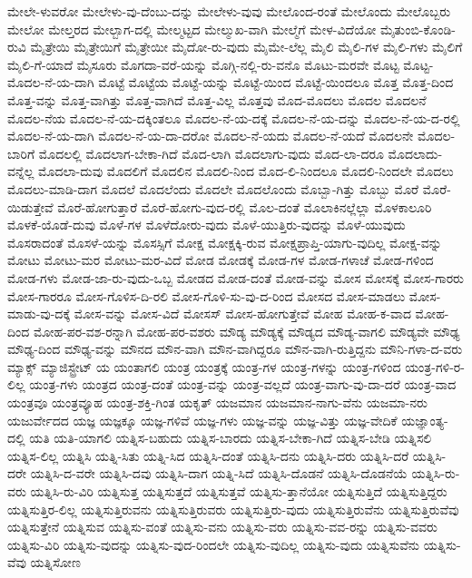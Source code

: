 {ಮೇಲೇ-ಳುವರೋ
ಮೇಲೇಳು-ವು-ದೆಂಬು-ದನ್ನು
ಮೇಲೇಳು-ವುವು
ಮೇಲೊಂದ-ರಂತೆ
ಮೇಲೊಂದು
ಮೇಲೊಬ್ಬರು
ಮೇಲೋ
ಮೇಲ್ತರದ
ಮೇಲ್ಬಾಗ-ದಲ್ಲಿ
ಮೇಲ್ಮಟ್ಟದ
ಮೇಲ್ಮುಖ-ವಾಗಿ
ಮೇಲ್ಮೆಗೆ
ಮೇಳ-ವಿದೆಯೋ
ಮೈತುಂಬಿ-ಕೊಂಡಿ-ರುವಿ
ಮೈತ್ರೇಯಿ
ಮೈತ್ರೇಯಿಗೆ
ಮೈತ್ರೇಯೀ
ಮೈದೋ-ರು-ವುದು
ಮೈಮೇ-ಲೆಲ್ಲ
ಮೈಲಿ
ಮೈಲಿ-ಗಳ
ಮೈಲಿ-ಗಳು
ಮೈಲಿಗೆ
ಮೈಲಿ-ಗೆ-ಯಾದೆ
ಮೈಸೂರು
ಮೊಗದಾ-ವರೆ-ಯನ್ನು
ಮೊಗ್ಗಿ-ನಲ್ಲಿ-ರು-ವನೊ
ಮೊಟು-ಮರವೇ
ಮೊಟ್ಟ
ಮೊಟ್ಟ-ಮೊದಲ-ನೆ-ಯ-ದಾಗಿ
ಮೊಟ್ಟೆ
ಮೊಟ್ಟೆಯ
ಮೊಟ್ಟೆ-ಯನ್ನು
ಮೊಟ್ಟೆ-ಯಿಂದ
ಮೊಟ್ಟೆ-ಯಿಂದಲೂ
ಮೊತ್ತ
ಮೊತ್ತ-ದಿಂದ
ಮೊತ್ತ-ವನ್ನು
ಮೊತ್ತ-ವಾಗಿತ್ತು
ಮೊತ್ತ-ವಾಗಿದೆ
ಮೊತ್ತ-ವಿಲ್ಲ
ಮೊತ್ತವು
ಮೊದ-ಮೊದಲು
ಮೊದಲ
ಮೊದಲನೆ
ಮೊದಲ-ನೆಯ
ಮೊದಲ-ನೆ-ಯ-ದಕ್ಕಿಂತಲೂ
ಮೊದಲ-ನೆ-ಯ-ದಕ್ಕೆ
ಮೊದಲ-ನೆ-ಯ-ದನ್ನು
ಮೊದಲ-ನೆ-ಯ-ದ-ರಲ್ಲಿ
ಮೊದಲ-ನೆ-ಯ-ದಾಗಿ
ಮೊದಲ-ನೆ-ಯ-ದಾ-ದರೋ
ಮೊದಲ-ನೆ-ಯದು
ಮೊದಲ-ನೆ-ಯದೆ
ಮೊದಲನೇ
ಮೊದಲ-ಬಾರಿಗೆ
ಮೊದಲಲ್ಲಿ
ಮೊದಲಾಗ-ಬೇಕಾ-ಗಿದೆ
ಮೊದ-ಲಾಗಿ
ಮೊದಲಾಗು-ವುದು
ಮೊದ-ಲಾ-ದರೂ
ಮೊದಲಾದು-ವನ್ನೆಲ್ಲ
ಮೊದಲಾ-ದುವು
ಮೊದಲಿಗೆ
ಮೊದಲಿನ
ಮೊದಲಿ-ನಿಂದ
ಮೊದ-ಲಿ-ನಿಂದಲೂ
ಮೊದಲಿ-ನಿಂದಲೇ
ಮೊದಲು
ಮೊದಲು-ಮಾಡಿ-ದಾಗ
ಮೊದಲೆ
ಮೊದಲೆಂದು
ಮೊದಲೇ
ಮೊದಲೊಂದು
ಮೊಬ್ಬಾ-ಗಿತ್ತು
ಮೊಬ್ಬು
ಮೊರೆ
ಮೊರೆ-ಯಿಡುತ್ತೇವೆ
ಮೊರೆ-ಹೋಗುತ್ತಾರೆ
ಮೊರೆ-ಹೋಗು-ವುದ-ರಲ್ಲಿ
ಮೊಲ-ದಂತೆ
ಮೊಲಾಕಿನಲ್ಲೆಲ್ಲಾ
ಮೊಳಕಾಲೂರಿ
ಮೊಳಕೆ-ಯೊಡೆ-ದುವು
ಮೊಳೆ-ಗಳ
ಮೊಳೆದೋರು-ವುದು
ಮೊಳೆ-ಯುತ್ತಿರು-ವುದನ್ನು
ಮೊಳೆ-ಯುವುದು
ಮೊಸರಾದಂತೆ
ಮೊಸಳೆ-ಯನ್ನು
ಮೊಸಸ್ಸಿಗೆ
ಮೋಕ್ಷ
ಮೋಕ್ಷಕ್ಕಿ-ರುವ
ಮೋಕ್ಷಪ್ರಾಪ್ತಿ-ಯಾಗು-ವುದಿಲ್ಲ
ಮೋಕ್ಷ-ವನ್ನು
ಮೋಟು
ಮೋಟು-ಮರ
ಮೋಟು-ಮರ-ವಿದೆ
ಮೋಡ
ಮೋಡಕ್ಕೆ
ಮೋಡ-ಗಳ
ಮೋಡ-ಗಳಾಚೆ
ಮೋಡ-ಗಳಿಂದ
ಮೋಡ-ಗಳು
ಮೋಡ-ಜಾ-ರು-ವುದು-ಒಬ್ಬ
ಮೋಡದ
ಮೋಡ-ದಂತೆ
ಮೋಡ-ವನ್ನು
ಮೋಸ
ಮೋಸಕ್ಕೆ
ಮೋಸ-ಗಾರರು
ಮೋಸ-ಗಾರರೂ
ಮೋಸ-ಗೊಳಿಸ-ದಿ-ರಲಿ
ಮೋಸ-ಗೊಳಿ-ಸು-ವು-ದ-ರಿಂದ
ಮೋಸದ
ಮೋಸ-ಮಾಡಲು
ಮೋಸ-ಮಾಡು-ವು-ದಕ್ಕೆ
ಮೋಸ-ವನ್ನು
ಮೋಸ-ವಿದೆ
ಮೋಸಸ್
ಮೋಸ-ಹೋಗುತ್ತೇವೆ
ಮೋಹ
ಮೋಹ-ಕ-ವಾದ
ಮೋಹ-ದಿಂದ
ಮೋಹ-ಪರ-ವಶ-ರನ್ನಾಗಿ
ಮೋಹ-ಪರ-ವಶರು
ಮೌಡ್ಯ
ಮೌಡ್ಯಕ್ಕೆ
ಮೌಡ್ಯದ
ಮೌಡ್ಯ-ವಾಗಲಿ
ಮೌಡ್ಯವೇ
ಮೌಢ್ಯ
ಮೌಢ್ಯ-ದಿಂದ
ಮೌಢ್ಯ-ವನ್ನು
ಮೌನದ
ಮೌನ-ವಾಗಿ
ಮೌನ-ವಾಗಿದ್ದರೂ
ಮೌನ-ವಾಗಿ-ರುತ್ತಿದ್ದನು
ಮೌನಿ-ಗಳಾ-ದ-ವರು
ಮ್ಯಾಕ್ಸ್
ಮ್ಯಾಜಿಸ್ಟ್ರೇಟ್
ಯ
ಯಂತಾಗಲಿ
ಯಂತ್ರ
ಯಂತ್ರಕ್ಕೆ
ಯಂತ್ರ-ಗಳ
ಯಂತ್ರ-ಗಳನ್ನು
ಯಂತ್ರ-ಗಳಿಂದ
ಯಂತ್ರ-ಗಳಿ-ರ-ಲಿಲ್ಲ
ಯಂತ್ರ-ಗಳು
ಯಂತ್ರದ
ಯಂತ್ರ-ದಂತೆ
ಯಂತ್ರ-ವನ್ನು
ಯಂತ್ರ-ವಲ್ಲದೆ
ಯಂತ್ರ-ವಾಗು-ವು-ದಾ-ದರೆ
ಯಂತ್ರ-ವಾದ
ಯಂತ್ರವೂ
ಯಂತ್ರವ್ಯೂಹ
ಯಂತ್ರ-ಶಕ್ತಿ-ಗಿಂತ
ಯಕೃತ್
ಯಜಮಾನ
ಯಜಮಾನ-ನಾಗು-ವೆನು
ಯಜಮಾ-ನರು
ಯಜುರ್ವೇದದ
ಯಜ್ಞ
ಯಜ್ಞಕ್ಕೂ
ಯಜ್ಞ-ಗಳಿವೆ
ಯಜ್ಞ-ಗಳು
ಯಜ್ಞ-ವನ್ನು
ಯಜ್ಞ-ವಿತ್ತು
ಯಜ್ಞ-ವೇದಿಕೆ
ಯಜ್ಞಾಂತ್ಯ-ದಲ್ಲಿ
ಯತಿ
ಯತಿ-ಯಾಗಲಿ
ಯತ್ನಿಸ-ಬಹುದು
ಯತ್ನಿಸ-ಬಾರದು
ಯತ್ನಿಸ-ಬೇಕಾ-ಗಿದೆ
ಯತ್ನಿಸ-ಬೇಡಿ
ಯತ್ನಿಸಲಿ
ಯತ್ನಿಸ-ಲಿಲ್ಲ
ಯತ್ನಿಸಿ
ಯತ್ನಿ-ಸಿತು
ಯತ್ನಿ-ಸಿದ
ಯತ್ನಿಸಿ-ದಂತೆ
ಯತ್ನಿಸಿ-ದನು
ಯತ್ನಿಸಿ-ದರು
ಯತ್ನಿಸಿ-ದರೆ
ಯತ್ನಿಸಿ-ದರೇ
ಯತ್ನಿಸಿ-ದ-ವರೇ
ಯತ್ನಿಸಿ-ದವು
ಯತ್ನಿಸಿ-ದಾಗ
ಯತ್ನಿ-ಸಿದೆ
ಯತ್ನಿಸಿ-ದೊಡನೆ
ಯತ್ನಿಸಿ-ದೊಡನೆಯೆ
ಯತ್ನಿಸಿ-ರು-ವರು
ಯತ್ನಿಸಿ-ರು-ವಿರಿ
ಯತ್ನಿಸುತ್ತ
ಯತ್ನಿಸುತ್ತದೆ
ಯತ್ನಿಸುತ್ತವೆ
ಯತ್ನಿಸು-ತ್ತಾನೆಯೋ
ಯತ್ನಿಸುತ್ತಿದೆ
ಯತ್ನಿಸುತ್ತಿದ್ದರು
ಯತ್ನಿಸುತ್ತಿರ-ಲಿಲ್ಲ
ಯತ್ನಿಸುತ್ತಿರುವನು
ಯತ್ನಿಸುತ್ತಿರುವರು
ಯತ್ನಿಸುತ್ತಿರು-ವುದು
ಯತ್ನಿಸುತ್ತಿರುವೆನು
ಯತ್ನಿಸುತ್ತಿರುವೆವು
ಯತ್ನಿಸುತ್ತೇನೆ
ಯತ್ನಿಸುವ
ಯತ್ನಿಸು-ವಂತೆ
ಯತ್ನಿಸು-ವನು
ಯತ್ನಿಸು-ವರು
ಯತ್ನಿಸು-ವವ-ರನ್ನು
ಯತ್ನಿಸು-ವವರು
ಯತ್ನಿಸು-ವಿರಿ
ಯತ್ನಿಸು-ವುದನ್ನು
ಯತ್ನಿಸು-ವುದ-ರಿಂದಲೇ
ಯತ್ನಿಸು-ವುದಿಲ್ಲ
ಯತ್ನಿಸು-ವುದು
ಯತ್ನಿಸುವೆನು
ಯತ್ನಿಸು-ವೆವು
ಯತ್ನಿಸೋಣ
}
